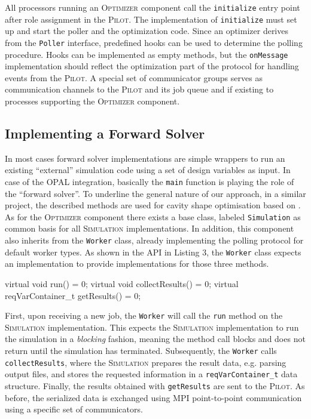 \documentclass[preprint,linenumbers,amsmath,amssymb,aps,prstab]{revtex4-1}%
\begin{document}
All processors running an \textsc{Optimizer} component call the
  \texttt{initialize} entry point after role assignment in the
  \textsc{Pilot}.
The implementation of \texttt{initialize} must set up and start the poller and
  the optimization code.
Since an optimizer derives from the \texttt{Poller} interface, predefined
  hooks can be used to determine the polling procedure.
Hooks can be implemented as empty methods, but the \texttt{onMessage}
  implementation should reflect the optimization part of the protocol for
  handling events from the \textsc{Pilot}.
A special set of communicator groups serves as communication channels to the
  \textsc{Pilot} and its job queue and if existing to processes supporting the
  \textsc{Optimizer} component.


\subsection{Implementing a Forward Solver}

In most cases forward solver implementations are simple wrappers to run
  an existing ``external'' simulation code using a set of design variables as
  input. In case of the OPAL integration, basically the \texttt{main} function is
  playing the role of the ``forward solver''. To underline the general nature of our approach, 
  in a similar project, the described methods are used for cavity shape optimisation based on \cite{ARBENZ2008381}. 
As for the \textsc{Optimizer} component there exists a base class, labeled
  \texttt{Simulation} as common basis for all \textsc{Simulation}
  implementations.
In addition, this component also inherits from the \texttt{Worker} class,
  already implementing the polling protocol for default worker types.
As shown in the API in Listing 3, the \texttt{Worker} class expects an
  implementation to provide implementations for those three methods.

\begin{code}
virtual void run() = 0;
virtual void collectResults() = 0;
virtual reqVarContainer_t getResults() = 0;
\end{code}

First, upon receiving a new job, the \texttt{Worker} will call the
  \texttt{run} method on the \textsc{Simulation} implementation.
This expects the \textsc{Simulation} implementation to run the simulation in a
  \textit{blocking} fashion, meaning the method call blocks and does not return
  until the simulation has terminated.
Subsequently, the \texttt{Worker} calls \texttt{collectResults}, where the
  \textsc{Simulation} prepares the result data, e.g. parsing output files,
  and stores the requested information in a \texttt{reqVarContainer\_t} data
  structure.
Finally, the results obtained with \texttt{getResults} are sent to the
  \textsc{Pilot}.
As before, the serialized data is exchanged using MPI point-to-point
  communication using a specific set of communicators.
\end{document}
